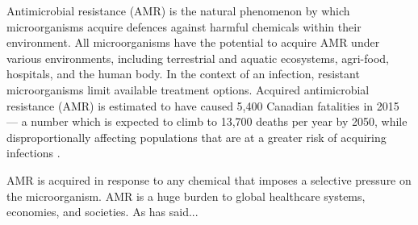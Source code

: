 Antimicrobial resistance (AMR) is the natural phenomenon by which microorganisms acquire defences against harmful chemicals within their environment.
All microorganisms have the potential to acquire AMR under various environments, including terrestrial and aquatic ecosystems, agri-food, hospitals, and the human body.
In the context of an infection, resistant microorganisms limit available treatment options.
Acquired antimicrobial resistance (AMR) is estimated to have caused 5,400 Canadian fatalities in 2015 — a number which is expected to climb to 13,700 deaths per year by 2050, while disproportionally affecting populations that are at a greater risk of acquiring infections \parencite{councilofcanadianacademiesWhenAntibioticsFail2019}.

AMR is acquired in response to any chemical that imposes a selective pressure on the microorganism.
AMR is a huge burden to global healthcare systems, economies, and societies.
As \textcite{buongerminopereiraComprehensiveSurveyIntegronassociated2020} has said...
